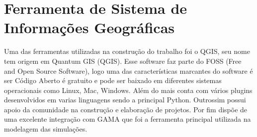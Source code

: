 


\section{Ferramenta de Sistema de Informações Geográficas }

Uma das ferramentas utilizadas na construção do trabalho foi o QGIS, seu nome tem origem em Quantum GIS (QGIS). Esse software faz parte do FOSS (Free and Open Source Software), logo uma das características marcantes do software é ser Código Aberto é gratuito\cite{Qgis:online} e pode ser baixado em diferentes sistemas operacionais como Linux, Mac, Windows. Além do mais conta com vários plugins desenvolvidos em varias linguagens sendo a principal Python. Outrossim possui apoio da comunidade na construção e elaboração de projetos. Por fim dispõe de uma excelente integração com GAMA que foi a ferramenta principal utilizada na modelagem das simulações. 


